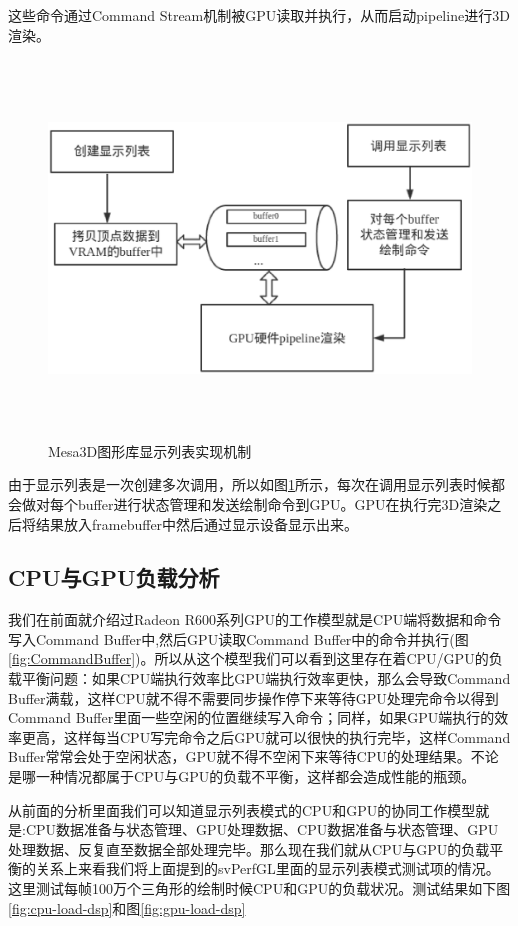 这些命令通过Command Stream机制被GPU读取并执行，从而启动pipeline进行3D渲染。

\begin{figure}[H] 
  \centering
  \includegraphics[width=12cm,height=10cm]{figures/chap03/display-list-flow}
  \caption{Mesa3D图形库显示列表实现机制}
  \label{fig:display-list-flow}
\end{figure}

由于显示列表是一次创建多次调用，所以如图\ref{fig:display-list-flow}所示，每次在调用显示列表时候都会做对每个buffer进行状态管理和发送绘制命令到GPU。GPU在执行完3D渲染之后将结果放入framebuffer中然后通过显示设备显示出来。

\subsection{CPU与GPU负载分析}

我们在前面就介绍过Radeon R600系列GPU的工作模型就是CPU端将数据和命令写入Command Buffer中,然后GPU读取Command Buffer中的命令并执行(图\ref{fig:CommandBuffer})。所以从这个模型我们可以看到这里存在着CPU/GPU的负载平衡问题：如果CPU端执行效率比GPU端执行效率更快，那么会导致Command Buffer满载，这样CPU就不得不需要同步操作停下来等待GPU处理完命令以得到Command Buffer里面一些空闲的位置继续写入命令；同样，如果GPU端执行的效率更高，这样每当CPU写完命令之后GPU就可以很快的执行完毕，这样Command Buffer常常会处于空闲状态，GPU就不得不空闲下来等待CPU的处理结果。不论是哪一种情况都属于CPU与GPU的负载不平衡，这样都会造成性能的瓶颈。

从前面的分析里面我们可以知道显示列表模式的CPU和GPU的协同工作模型就是:CPU数据准备与状态管理、GPU处理数据、CPU数据准备与状态管理、GPU处理数据、反复直至数据全部处理完毕。那么现在我们就从CPU与GPU的负载平衡的关系上来看我们将上面提到的svPerfGL里面的显示列表模式测试项的情况。这里测试每帧100万个三角形的绘制时候CPU和GPU的负载状况。测试结果如下图\ref{fig:cpu-load-dsp}和图\ref{fig:gpu-load-dsp}

